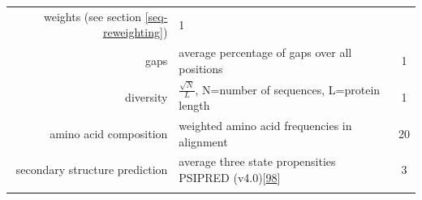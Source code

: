 \documentclass[12pt,a4paper,twoside]{book}
\theoremstyle{definition}
\theoremstyle{definition}
\theoremstyle{remark}
\begin{document}
\begin{longtable}[]{@{}rlc@{}}
\begin{minipage}[t]{0.50\columnwidth}
weights (see section \ref{seq-reweighting})\strut
\end{minipage} & \begin{minipage}[t]{0.18\columnwidth}\centering\strut
1\strut
\end{minipage}\tabularnewline
\begin{minipage}[t]{0.23\columnwidth}\raggedleft\strut
gaps\strut
\end{minipage} & \begin{minipage}[t]{0.50\columnwidth}\raggedright\strut
average percentage of gaps over all positions\strut
\end{minipage} & \begin{minipage}[t]{0.18\columnwidth}\centering\strut
1\strut
\end{minipage}\tabularnewline
\begin{minipage}[t]{0.23\columnwidth}\raggedleft\strut
diversity\strut
\end{minipage} & \begin{minipage}[t]{0.50\columnwidth}\raggedright\strut
\(\frac{\sqrt{N}}{L}\), N=number of sequences, L=protein length\strut
\end{minipage} & \begin{minipage}[t]{0.18\columnwidth}\centering\strut
1\strut
\end{minipage}\tabularnewline
\begin{minipage}[t]{0.23\columnwidth}\raggedleft\strut
amino acid composition\strut
\end{minipage} & \begin{minipage}[t]{0.50\columnwidth}\raggedright\strut
weighted amino acid frequencies in alignment\strut
\end{minipage} & \begin{minipage}[t]{0.18\columnwidth}\centering\strut
20\strut
\end{minipage}\tabularnewline
\begin{minipage}[t]{0.23\columnwidth}\raggedleft\strut
secondary structure prediction\strut
\end{minipage} & \begin{minipage}[t]{0.50\columnwidth}\raggedright\strut
average three state propensities PSIPRED
(v4.0){[}\protect\hyperlink{ref-Jones1999}{98}{]}\strut
\end{minipage} & \begin{minipage}[t]{0.18\columnwidth}\centering\strut
3\strut
\end{minipage}\tabularnewline
\begin{minipage}[t]{0.23\columnwidth}\raggedleft\strut

\end{minipage}
\end{longtable}
\end{document}
